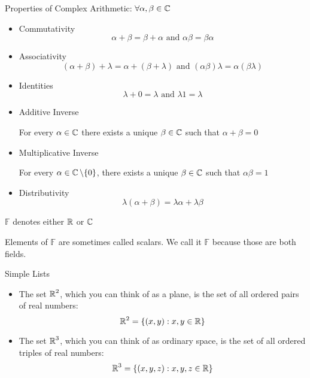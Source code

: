 \begin{note} 
    Properties of Complex Arithmetic: $\forall \alpha, \beta \in \operatorname{\mathbb{C}}$
    \begin{itemize}
        \item Commutativity
        \[ \alpha + \beta = \beta + \alpha \text{ and } \alpha \beta = \beta \alpha\]
        \item Associativity
        \[ (\alpha + \beta) + \lambda = \alpha + (\beta + \lambda) \text{ and } (\alpha\beta)\lambda = \alpha(\beta \lambda) \]
        \item Identities
        \[ \lambda + 0 = \lambda \text{ and } \lambda 1 = \lambda \]
        \item Additive Inverse
        \begin{center}
           For every $\alpha \in \operatorname{\mathbb{C}}$ there exists a unique $\beta \in \operatorname{\mathbb{C}}$ such that $\alpha + \beta = 0$ 
        \end{center}
        \item Multiplicative Inverse
        \begin{center}
            For every  $\alpha \in \operatorname{\mathbb{C}} \setminus \{0\}$, there exists a unique $\beta \in \operatorname{\mathbb{C}}$ such that $\alpha \beta = 1$ 
        \end{center}
        \item Distributivity
        \[ \lambda(\alpha + \beta) = \lambda \alpha + \lambda \beta \]
    \end{itemize}
\end{note}

\begin{definition}
    $\mathbb{F}$ denotes either $\operatorname{\mathbb{R}}$ or $\operatorname{\mathbb{C}}$
\end{definition}
Elements of $\mathbb{F}$ are sometimes called scalars.
We call it $\mathbb{F}$ because those are both fields.

\begin{definition} Simple Lists
    \begin{itemize}
        \item The set $\operatorname{\mathbb{R}}^2$, which you can think of as a plane, is the set of all ordered
        pairs of real numbers:
        \[ \operatorname{\mathbb{R}}^2 = \{(x, y) : x, y \in \operatorname{\mathbb{R}}\} \]
        \item The set $\operatorname{\mathbb{R}}^3$, which you can think of as ordinary space, is the set of all
        ordered triples of real numbers:
        \[ \operatorname{\mathbb{R}}^3 = \{(x, y, z) : x, y, z \in \operatorname{\mathbb{R}}\} \]
    \end{itemize}
\end{definition}

